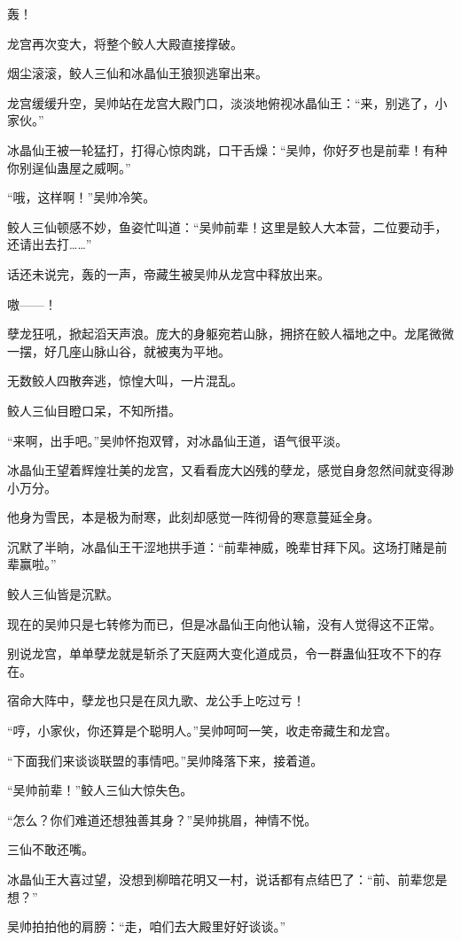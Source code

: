 \begin{this_body}
轰！

龙宫再次变大，将整个鲛人大殿直接撑破。

烟尘滚滚，鲛人三仙和冰晶仙王狼狈逃窜出来。

龙宫缓缓升空，吴帅站在龙宫大殿门口，淡淡地俯视冰晶仙王：“来，别逃了，小家伙。”

冰晶仙王被一轮猛打，打得心惊肉跳，口干舌燥：“吴帅，你好歹也是前辈！有种你别逞仙蛊屋之威啊。”

“哦，这样啊！”吴帅冷笑。

鲛人三仙顿感不妙，鱼姿忙叫道：“吴帅前辈！这里是鲛人大本营，二位要动手，还请出去打……”

话还未说完，轰的一声，帝藏生被吴帅从龙宫中释放出来。

嗷——！

孽龙狂吼，掀起滔天声浪。庞大的身躯宛若山脉，拥挤在鲛人福地之中。龙尾微微一摆，好几座山脉山谷，就被夷为平地。

无数鲛人四散奔逃，惊惶大叫，一片混乱。

鲛人三仙目瞪口呆，不知所措。

“来啊，出手吧。”吴帅怀抱双臂，对冰晶仙王道，语气很平淡。

冰晶仙王望着辉煌壮美的龙宫，又看看庞大凶残的孽龙，感觉自身忽然间就变得渺小万分。

他身为雪民，本是极为耐寒，此刻却感觉一阵彻骨的寒意蔓延全身。

沉默了半晌，冰晶仙王干涩地拱手道：“前辈神威，晚辈甘拜下风。这场打赌是前辈赢啦。”

鲛人三仙皆是沉默。

现在的吴帅只是七转修为而已，但是冰晶仙王向他认输，没有人觉得这不正常。

别说龙宫，单单孽龙就是斩杀了天庭两大变化道成员，令一群蛊仙狂攻不下的存在。

宿命大阵中，孽龙也只是在凤九歌、龙公手上吃过亏！

“哼，小家伙，你还算是个聪明人。”吴帅呵呵一笑，收走帝藏生和龙宫。

“下面我们来谈谈联盟的事情吧。”吴帅降落下来，接着道。

“吴帅前辈！”鲛人三仙大惊失色。

“怎么？你们难道还想独善其身？”吴帅挑眉，神情不悦。

三仙不敢还嘴。

冰晶仙王大喜过望，没想到柳暗花明又一村，说话都有点结巴了：“前、前辈您是想？”

吴帅拍拍他的肩膀：“走，咱们去大殿里好好谈谈。”

\end{this_body}


